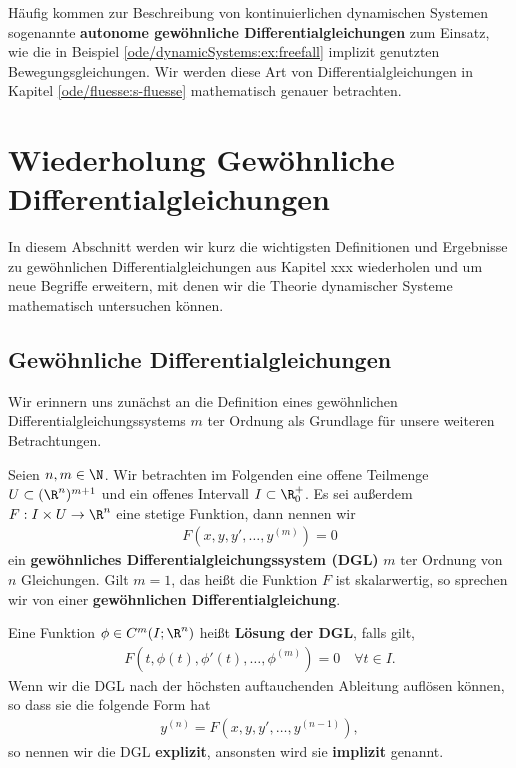 \documentclass[letterpaper,10pt,english]{jupyterBook}
\begin{document}
Häufig kommen zur Beschreibung von kontinuierlichen dynamischen Systemen sogenannte \textbf{autonome gewöhnliche Differentialgleichungen} zum Einsatz, wie die in Beispiel \cref{ode/dynamicSystems:ex:freefall} implizit genutzten Bewegungsgleichungen.
Wir werden diese Art von Differentialgleichungen in Kapitel \cref{ode/fluesse:s-fluesse}  mathematisch genauer betrachten.


\section{Wiederholung Gewöhnliche Differentialgleichungen}
\label{\detokenize{ode/repetition:wiederholung-gewohnliche-differentialgleichungen}}\label{\detokenize{ode/repetition::doc}}
In diesem Abschnitt werden wir kurz die wichtigsten Definitionen und Ergebnisse zu gewöhnlichen Differentialgleichungen aus Kapitel xxx \cite{Ten21} wiederholen und um neue Begriffe erweitern, mit denen wir die Theorie dynamischer Systeme mathematisch untersuchen können.


\subsection{Gewöhnliche Differentialgleichungen}
\label{\detokenize{ode/repetition:gewohnliche-differentialgleichungen}}
Wir erinnern uns zunächst an die Definition eines gewöhnlichen Differentialgleichungssystems \(m\) ter Ordnung als Grundlage für unsere weiteren Betrachtungen.
\label{ode/repetition:def:DGL}
\begin{definition}{}{}



Seien \(n,m \in \N\).
Wir betrachten im Folgenden eine offene Teilmenge \(U\subset (\R^n)^{m+1}\) und ein offenes Intervall \(I\subset\R^+_0\).
Es sei außerdem \(F:I\times U\rightarrow\R^n\) eine stetige Funktion, dann nennen wir
\begin{align}\label{equation:ode/repetition:eq:DGL}
F(x,y,y',\ldots,y^{(m)}) = 0
\end{align}
ein \textbf{gewöhnliches Differentialgleichungssystem (DGL)} \(m\) ter Ordnung von \(n\) Gleichungen.
Gilt \(m=1\), das heißt die Funktion \(F\) ist skalarwertig, so sprechen wir von einer \textbf{gewöhnlichen Differentialgleichung}.

Eine Funktion \(\phi\in C^m(I;\R^n)\) heißt \textbf{Lösung der DGL}, falls gilt,
\begin{align*}
F(t, \phi(t), \phi'(t), \ldots, \phi^{(m)}) = 0 \quad \forall t\in I.
\end{align*}
Wenn wir die DGL nach der höchsten auftauchenden Ableitung auflösen können, so dass sie die folgende Form hat
\begin{align*}
y^{(n)} = F(x,y,y',\ldots,y^{(n-1)}),
\end{align*}
so nennen wir die DGL \textbf{explizit}, ansonsten wird sie \textbf{implizit} genannt.
\end{definition}
\end{document}
